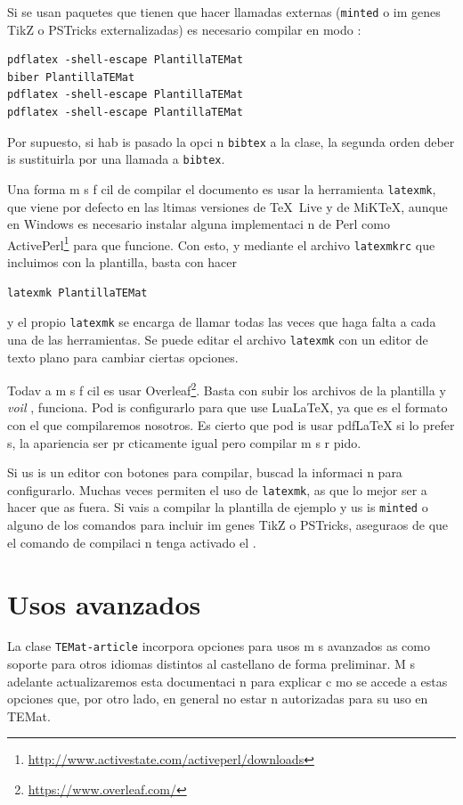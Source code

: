 \documentclass{article}
\begin{document}
Si se usan paquetes que tienen que hacer llamadas externas (\verb+minted+ o im genes TikZ o PSTricks externalizadas) es necesario compilar en modo :
\begin{verbatim}
pdflatex -shell-escape PlantillaTEMat
biber PlantillaTEMat
pdflatex -shell-escape PlantillaTEMat
pdflatex -shell-escape PlantillaTEMat
\end{verbatim}

Por supuesto, si hab is pasado la opci n \verb+bibtex+ a la clase, la segunda orden deber is sustituirla por una llamada a \verb+bibtex+.

Una forma m s f cil de compilar el documento es usar la herramienta \verb+latexmk+, que viene por defecto en las  ltimas versiones de \TeX~Live y de MiK\TeX{}, aunque en Windows es necesario instalar alguna implementaci n de Perl como ActivePerl\footnote{\url{http://www.activestate.com/activeperl/downloads}} para que funcione.
Con esto, y mediante el archivo \verb+latexmkrc+ que incluimos con la plantilla, basta con hacer
\begin{verbatim}
latexmk PlantillaTEMat
\end{verbatim}
y el propio \verb+latexmk+ se encarga de llamar todas las veces que haga falta a cada una de las herramientas.
Se puede editar el archivo \verb+latexmk+ con un editor de texto plano para cambiar ciertas opciones.

Todav a m s f cil es usar Overleaf\footnote{\url{https://www.overleaf.com/}}.
Basta con subir los archivos de la plantilla y \emph{voil }, funciona.
Pod is configurarlo para que use LuaLaTeX, ya que es el formato con el que compilaremos nosotros.
Es cierto que pod is usar pdfLaTeX si lo prefer s, la apariencia ser  pr cticamente igual pero compilar  m s r pido.

Si us is un editor con botones para compilar, buscad la informaci n para configurarlo.
Muchas veces permiten el uso de \verb+latexmk+, as  que lo mejor ser a hacer que as  fuera.
Si vais a compilar la plantilla de ejemplo y us is \verb+minted+ o alguno de los comandos para incluir im genes TikZ o PSTricks, aseguraos de que el comando de compilaci n tenga activado el .


\section{Usos avanzados}

La clase \verb+TEMat-article+ incorpora opciones para usos m s avanzados as  como soporte para otros idiomas distintos al castellano de forma preliminar.
M s adelante actualizaremos esta documentaci n para explicar c mo se accede a estas opciones que, por otro lado, en general no estar n autorizadas para su uso en TEMat.
\end{document}
